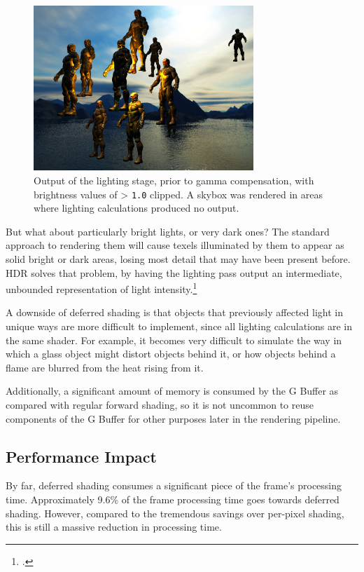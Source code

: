\documentclass[11pt, oneside]{report}
\begin{document}
\begin{figure}[!htbp]
   \centering
   \includegraphics[width=0.74\textwidth, frame]{images/lighting_out.png}
   \caption{Output of the lighting stage, prior to gamma compensation, with brightness values of > \texttt{1.0} clipped. A \gls{skybox} was rendered in areas where lighting calculations produced no output.}
   \label{fig:f14}
\end{figure}

But what about particularly bright lights, or very dark ones? The standard approach to rendering them will cause \glspl{texel} illuminated by them to appear as solid bright or dark areas, losing most detail that may have been present before. \gls{HDR} solves that problem, by having the lighting pass output an intermediate, unbounded representation of light intensity.\footcite{trebilco-deferred}

A downside of deferred shading is that objects that previously affected light in unique ways are more difficult to implement, since all lighting calculations are in the same shader. For example, it becomes very difficult to simulate the way in which a glass object might distort objects behind it, or how objects behind a flame are blurred from the heat rising from it.

Additionally, a significant amount of memory is consumed by the \gls{G Buffer} as compared with regular \gls{forward shading}, so it is not uncommon to reuse components of the \gls{G Buffer} for other purposes later in the rendering pipeline.

\subsection{Performance Impact}
By far, deferred shading consumes a significant piece of the frame's processing time. Approximately 9.6\% of the frame processing time goes towards deferred shading. However, compared to the tremendous savings over per-pixel shading, this is still a massive reduction in processing time.
\end{document}
